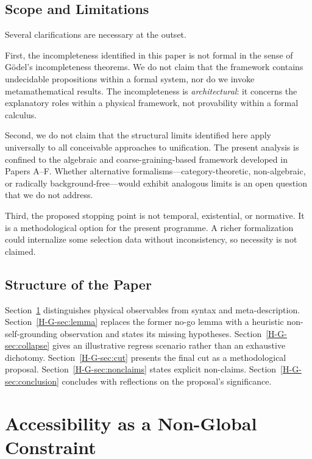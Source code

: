 \documentclass[12pt,a4paper,openany]{book}
\begin{document}
\subsection{Scope and Limitations}

Several clarifications are necessary at the outset.

First, the incompleteness identified in this paper is not formal in the sense of G\"{o}del's incompleteness theorems. We do not claim that the framework contains undecidable propositions within a formal system, nor do we invoke metamathematical results. The incompleteness is \emph{architectural}: it concerns the explanatory roles within a physical framework, not provability within a formal calculus.

Second, we do not claim that the structural limits identified here apply universally to all conceivable approaches to unification. The present analysis is confined to the algebraic and coarse-graining-based framework developed in Papers A--F. Whether alternative formalisms---category-theoretic, non-algebraic, or radically background-free---would exhibit analogous limits is an open question that we do not address.

Third, the proposed stopping point is not temporal, existential, or normative.  It is a methodological option for the present programme.  A richer formalization could internalize some selection data without inconsistency, so necessity is not claimed.

\subsection{Structure of the Paper}

Section~\ref{H-G-sec:accessibility} distinguishes physical observables from syntax and meta-description. Section~\ref{H-G-sec:lemma} replaces the former no-go lemma with a heuristic non-self-grounding observation and states its missing hypotheses. Section~\ref{H-G-sec:collapse} gives an illustrative regress scenario rather than an exhaustive dichotomy. Section~\ref{H-G-sec:cut} presents the final cut as a methodological proposal. Section~\ref{H-G-sec:nonclaims} states explicit non-claims. Section~\ref{H-G-sec:conclusion} concludes with reflections on the proposal's significance.

\section{Accessibility as a Non-Global Constraint}
\label{H-G-sec:accessibility}
\end{document}
